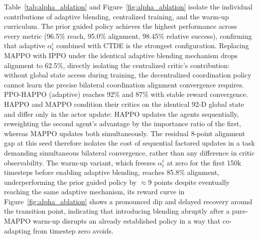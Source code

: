 
Table~\ref{tab:alpha_ablation} and Figure~\ref{fig:alpha_ablation} isolate the individual
contributions of adaptive blending, centralized training, and the warm-up curriculum. The prior guided policy achieves
the highest performance across every metric (96.5\% reach, 95.0\% alignment, 98.45\% relative
success), confirming that adaptive $\alpha_t^i$ combined with CTDE is the strongest configuration.
Replacing MAPPO with IPPO under the identical adaptive blending mechanism drops alignment to 62.5\%,
directly isolating the centralized critic's contribution: without global state access during
training, the decentralized coordination policy cannot learn the precise bilateral coordination
alignment convergence requires. PPO-HAPPO (adaptive) reaches 92\% and 87\% with stable reward
convergence. HAPPO and MAPPO condition their critics on the identical 92-D global state and differ
only in the actor update: HAPPO updates the agents sequentially, reweighting the second agent's
advantage by the importance ratio of the first, whereas MAPPO updates both simultaneously. The
residual 8-point alignment gap at this seed therefore isolates the cost of sequential factored
updates in a task demanding simultaneous bilateral convergence, rather than any difference in critic
observability. The warm-up variant, which freezes $\alpha_t^i$ at zero for the
first 150k timesteps before enabling adaptive blending, reaches 85.8\% alignment, underperforming
the prior guided policy by $\approx 9$ points despite eventually reaching the same adaptive mechanism, its reward curve
in Figure~\ref{fig:alpha_ablation} shows a pronounced dip and delayed recovery around the transition
point, indicating that introducing blending abruptly after a pure-MAPPO warm-up disrupts an already
established policy in a way that co-adapting from timestep zero avoids.

